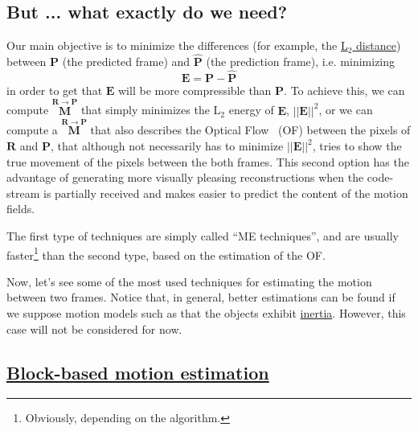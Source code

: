\subsection{But ... what exactly do we need?}
Our main objective is to minimize the differences (for example, the
\href{https://en.wikipedia.org/wiki/Euclidean_distance}{L$_2$
  distance}) between ${\mathbf P}$ (the predicted frame) and $\hat{\mathbf P}$ (the
prediction frame), i.e. minimizing
\begin{equation}
  {\mathbf E} = {\mathbf P} - \hat{\mathbf P}
\end{equation}
in order to get that ${\mathbf E}$ will be more compressible than
${\mathbf P}$. To achieve this, we can compute $\overset{{\mathbf
    R}\rightarrow {\mathbf P}}{\mathbf M}$ that simply minimizes the
L$_2$ energy of ${\mathbf E}$, $||{\mathbf E}||^2$, or we can compute
a $\overset{{\mathbf R}\rightarrow {\mathbf P}}{\mathbf M}$ that also describes the Optical
Flow~\cite{horn1981determining} (OF) between the pixels of ${\mathbf
  R}$ and ${\mathbf P}$, that although not necessarily has to
minimize $||{\mathbf E}||^2$, tries to show the true movement of the
pixels between the both frames. This second option has the advantage
of generating more visually pleasing reconstructions when the
code-stream is partially received and makes easier to predict the
content of the motion fields.

The first type of techniques are simply called ``ME techniques'', and
are usually faster\footnote{Obviously, depending on the algorithm.}
than the second type, based on the estimation of the OF.


Now, let's see some of the most used techniques for estimating the
motion between two frames. Notice that, in general, better estimations
can be found if we suppose motion models such as that the objects
exhibit
\href{https://en.wikipedia.org/wiki/Inertia}{inertia}. However, this
case will not be considered for now.

\subsection{\href{https://vicente-gonzalez-ruiz.github.io/video_compression/\#x1-40003}{Block-based motion estimation}}

